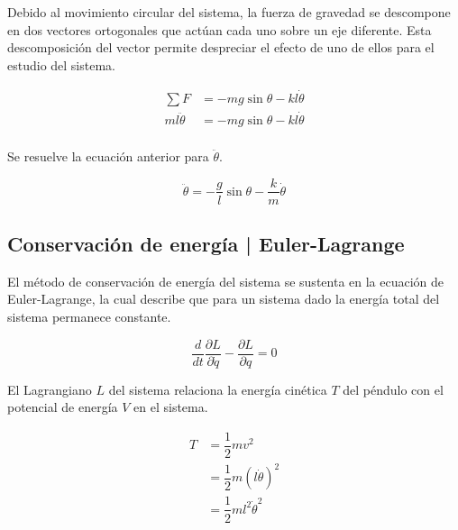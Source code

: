 Debido al movimiento circular del sistema, la fuerza de gravedad
se descompone en dos vectores ortogonales que actúan cada uno sobre un eje 
diferente. Esta descomposición del vector permite despreciar
el efecto de uno de ellos para el estudio del sistema.

\begin{equation*}
 \begin{split}
  \sum F &= -mg \sin{\theta} - k l \dot{\theta}\\
  m l \ddot{\theta} &= -mg \sin{\theta} - k l \dot{\theta}\\
 \end{split}
\end{equation*}

Se resuelve la ecuación anterior para $\ddot{\theta}$.

\begin{equation}
 \ddot{\theta} = - \dfrac{g}{l} \sin{\theta} - \dfrac{k}{m} \dot{\theta}
 \label{eq: newton equation}
\end{equation}


\subsection{Conservación de energía | Euler-Lagrange}

El método de conservación de energía del sistema se sustenta
en la ecuación de Euler-Lagrange, la cual describe que para un
sistema dado la energía total del sistema permanece constante.

\begin{equation}
 \dfrac{d}{dt} \dfrac{\partial L}{\partial \dot{q}} - 
 \dfrac{\partial L}{\partial q} = 0
 \label{eq: euler lagrange equation}
\end{equation}

El Lagrangiano $L$ del sistema relaciona la energía cinética $T$ 
del péndulo con el potencial de energía $V$ en el sistema.

\begin{equation*}
\begin{split}
 T &= \dfrac{1}{2} m v^2\\
 &= \dfrac{1}{2} m (l\dot{\theta})^2\\
 &= \dfrac{1}{2} m l^2 \dot{\theta}^2\\
\end{split}
\label{eq: kinetic energy}
\end{equation*}

